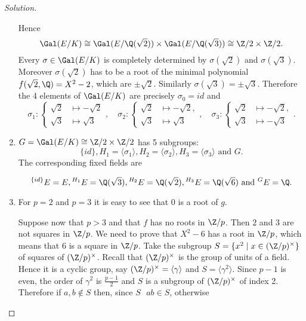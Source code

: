 \documentclass[a4paper,10pt,reqno]{amsart}
\newenvironment{sol}
  {\renewcommand\qedsymbol{$\blacksquare$}\begin{proof}[Solution]}
  {\end{proof}}
\begin{document}
\begin{sol}
\begin{enumerate}[label=(\roman*)]
    \begin{comment}
    \begin{multicols}{2}
\adjustbox{scale=.80,center}{%
\begin{tikzcd}
	& {E=\Q(\sqrt{2},\sqrt{3})}\arrow[rd,no head]\\
	{\Q(\sqrt{2})}\arrow[ru,no head,"\leq 2"]&& {\Q(\sqrt{3})}\arrow[ld,no head,"2"]  \\
	& {\Q}\arrow[lu,no head,"2"] 
 \end{tikzcd}
 }
 \vfill\null
 \columnbreak
But it is easy to see that $\sqrt{3}\notin \Q(\sqrt{2})$.
Hence $[E:\Q]=4$.
Moreover $\Q(\sqrt{2})\cap\Q(\sqrt{3})=\Q$, hence 
$\Gal(E/K)\cong\Gal(\Q(\sqrt{2})/\Q)\times \Gal(\Q(\sqrt{2})/\Q)\cong\Z/2\times\Z/2$.
 \end{multicols}
 \end{comment}
Hence
\[
\Gal(E/K)\cong\Gal(E/\Q(\sqrt{2}))\times \Gal(E/\Q(\sqrt{3}))\cong\Z/2\times\Z/2.
\]
 Every $\sigma\in\Gal(E/K)$ is completely determined by $\sigma(\sqrt{2})$ and $\sigma(\sqrt{3})$.
 Moreover $\sigma(\sqrt{2})$ has to be a root of
 the minimal polynomial $f(\sqrt{2},\Q)=X^2-2$,
 which are $\pm\sqrt{2}$.
 Similarly $\sigma(\sqrt{3})=\pm\sqrt{3}$.
 Therefore the 4 elements of $\Gal(E/K)$ are
 precisely $\sigma_0=id$ and
 \[
 \sigma_1:\begin{cases}
     \sqrt{2}&\mapsto -\sqrt{2}\\ \sqrt{3}&\mapsto \sqrt{3}
 \end{cases},\quad
 \sigma_2:\begin{cases}
     \sqrt{2}&\mapsto -\sqrt{2},\\ \sqrt{3}&\mapsto \sqrt{3}
 \end{cases},\quad \sigma_3:\begin{cases}
     \sqrt{2}&\mapsto -\sqrt{2},\\ \sqrt{3}&\mapsto -\sqrt{3}
 \end{cases}.
 \]
 \item $G=\Gal(E/K)\cong\Z/2\times\Z/2$ has 5 subgroups: \[
 \{id\}, H_1=\langle\sigma_1\rangle,H_2=\langle\sigma_2\rangle, H_3=\langle\sigma_3\rangle \text{ and }G.
 \]
 The corresponding fixed fields are
 
 \[
 {}^{\{id\}}E=E,{}^{H_1}E=\Q(\sqrt{3}),{}^{H_2}E=\Q(\sqrt{2}),{}^{H_3}E=\Q(\sqrt{6})\text{ and }{}^{G}E=\Q.
 \]
 \item For $p=2$ and $p=3$ it is easy to see that $0$ is a root of $g$.

 Suppose now that $p>3$ and that $f$ has no roots in $\Z/p$.
 Then $2$ and $3$ are not squares in $\Z/p$.
 We need to prove that $X^2-6$ has a root in $\Z/p$,
 which means that $6$ is a square in $\Z/p$.
 Take the subgroup
 $S=\{x^2\mid x\in (\Z/p)^{\times}\}$
 of squares of $(\Z/p)^{\times}$.
 Recall that $(\Z/p)^{\times}$ is the group of units of a field.
 Hence it is a cyclic group, 
 say $(\Z/p)^{\times}=\langle \gamma \rangle$ and
 $S=\langle \gamma^2\rangle$.
 Since $p-1$ is even, the order of $\gamma^2$ is $\frac{p-1}{2}$ and $S$ is a subgroup of $(\Z/p)^{\times}$ of index 2.
 Therefore if $a,b\notin S$ then, since $S$ $ $
 $ab\in S$,
 otherwise $ $
 

\end{enumerate}
\end{sol}
\end{document}

